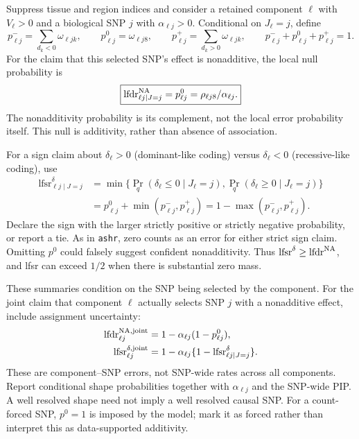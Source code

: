\documentclass[11pt]{article}
\begin{document}
Suppress tissue and region indices and consider a retained component
$\ell$ with $V_\ell>0$ and a biological SNP $j$ with $\alpha_{\ell j}>0$.
Conditional on $J_\ell=j$, define
\begin{equation}
 p^-_{\ell j}=\sum_{d_k<0}\omega_{\ell jk},\qquad
 p^0_{\ell j}=\omega_{\ell j8},\qquad
 p^+_{\ell j}=\sum_{d_k>0}\omega_{\ell jk},\qquad
 p^-_{\ell j}+p^0_{\ell j}+p^+_{\ell j}=1.
 \label{eq:shape-probs}
\end{equation}
For the claim that this selected SNP's effect is nonadditive, the local
null probability is
\begin{equation}
 \boxed{\operatorname{lfdr}^{\rm NA}_{\ell j\mid J=j}
       =p^0_{\ell j}=\rho_{\ell j8}/\alpha_{\ell j}.}
 \label{eq:shape-lfdr}
\end{equation}
The nonadditivity probability is its complement, not the local error
probability itself. This null is additivity, rather than absence of
association.

For a sign claim about $\delta_\ell>0$ (dominant-like coding) versus
$\delta_\ell<0$ (recessive-like coding), use
\begin{align}
 \operatorname{lfsr}^{\delta}_{\ell j\mid J=j}
 &=\min\{\Pr_q(\delta_\ell\leq0\mid J_\ell=j),
          \Pr_q(\delta_\ell\geq0\mid J_\ell=j)\}\nonumber\\
 &=p^0_{\ell j}+\min(p^-_{\ell j},p^+_{\ell j})
  =1-\max(p^-_{\ell j},p^+_{\ell j}).
 \label{eq:shape-lfsr}
\end{align}
Declare the sign with the larger strictly positive or strictly negative
probability, or report a tie. As in \texttt{ashr}, zero counts as an error
for either strict sign claim. Omitting $p^0$ could falsely suggest confident
nonadditivity. Thus $\operatorname{lfsr}^{\delta}\geq
\operatorname{lfdr}^{\rm NA}$, and lfsr can exceed $1/2$ when there is
substantial zero mass.

These summaries condition on the SNP being selected by the component.
For the joint claim that component $\ell$ actually selects SNP $j$ with a
nonadditive effect, include assignment uncertainty:
\begin{align}
 \operatorname{lfdr}^{\rm NA,joint}_{\ell j}
 &=1-\alpha_{\ell j}(1-p^0_{\ell j}),\nonumber\\
 \operatorname{lfsr}^{\delta,\rm joint}_{\ell j}
 &=1-\alpha_{\ell j}
       \{1-\operatorname{lfsr}^{\delta}_{\ell j\mid J=j}\}.
 \label{eq:snp-joint-errors}
\end{align}
These are component--SNP errors, not SNP-wide rates across all components.
Report conditional shape probabilities together with $\alpha_{\ell j}$
and the SNP-wide PIP. A well resolved shape need not imply a well resolved
causal SNP. For a count-forced SNP, $p^0=1$ is imposed by the model;
mark it as forced rather than interpret this as data-supported additivity.
\end{document}
